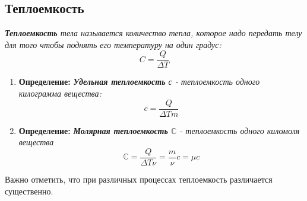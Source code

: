 \subsection{Теплоемкость}
 \textit{\textbf{Теплоемкость} тела называется количество тепла, которое надо передать телу для того чтобы поднять его температуру на один градус: \[ C = \frac{Q}{\Delta T} \] }
\begin{enumerate}
    \item \textbf{Определение:} \textit{\textbf{Удельная теплоемкость }с - теплоемкость одного килограмма вещества: \[ c = \frac{Q}{\Delta T m}\]}
    \item \textbf{Определение:} \textit{\textbf{Молярная теплоемкость }$\mathbb{C}$ - теплоемкость одного киломоля вещества }
          \[ \mathbb{C} = \frac{Q}{\Delta T \nu} = \frac{m}{\nu}c = \mu c\]
\end{enumerate}
Важно отметить, что при различных процессах теплоемкость различается существенно.

